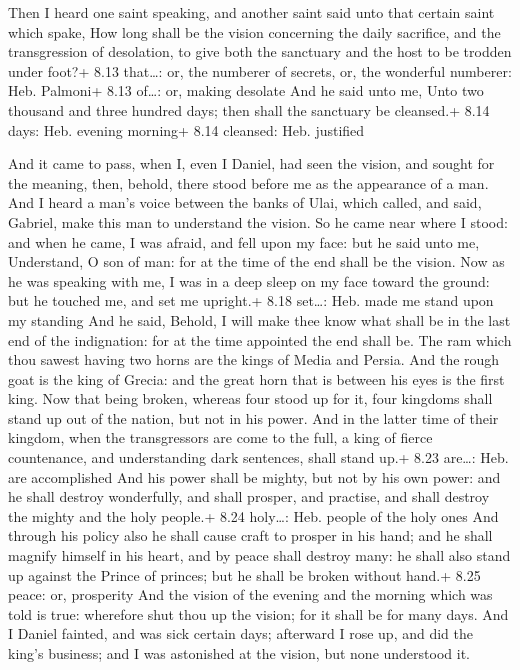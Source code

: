  Then I heard one saint speaking, and another saint said
unto that certain saint which spake, How long shall be the vision
concerning the daily sacrifice, and the transgression of desolation, to
give both the sanctuary and the host to be trodden under foot?+ 8.13
that\ldots: or, the numberer of secrets, or, the wonderful numberer:
Heb. Palmoni+ 8.13 of\ldots: or, making desolate  And he
said unto me, Unto two thousand and three hundred days; then shall the
sanctuary be cleansed.+ 8.14 days: Heb. evening morning+ 8.14 cleansed:
Heb. justified

 And it came to pass, when I, even I Daniel, had seen the
vision, and sought for the meaning, then, behold, there stood before me
as the appearance of a man.  And I heard a man's voice
between the banks of Ulai, which called, and said, Gabriel, make this
man to understand the vision.  So he came near where I
stood: and when he came, I was afraid, and fell upon my face: but he
said unto me, Understand, O son of man: for at the time of the end shall
be the vision.  Now as he was speaking with me, I was in a
deep sleep on my face toward the ground: but he touched me, and set me
upright.+ 8.18 set\ldots: Heb. made me stand upon my standing
 And he said, Behold, I will make thee know what shall be
in the last end of the indignation: for at the time appointed the end
shall be.  The ram which thou sawest having two horns are
the kings of Media and Persia.  And the rough goat is the
king of Grecia: and the great horn that is between his eyes is the first
king.  Now that being broken, whereas four stood up for it,
four kingdoms shall stand up out of the nation, but not in his power.
 And in the latter time of their kingdom, when the
transgressors are come to the full, a king of fierce countenance, and
understanding dark sentences, shall stand up.+ 8.23 are\ldots: Heb. are
accomplished  And his power shall be mighty, but not by his
own power: and he shall destroy wonderfully, and shall prosper, and
practise, and shall destroy the mighty and the holy people.+ 8.24
holy\ldots: Heb. people of the holy ones  And through his
policy also he shall cause craft to prosper in his hand; and he shall
magnify himself in his heart, and by peace shall destroy many: he shall
also stand up against the Prince of princes; but he shall be broken
without hand.+ 8.25 peace: or, prosperity  And the vision
of the evening and the morning which was told is true: wherefore shut
thou up the vision; for it shall be for many days.  And I
Daniel fainted, and was sick certain days; afterward I rose up, and did
the king's business; and I was astonished at the vision, but none
understood it.

